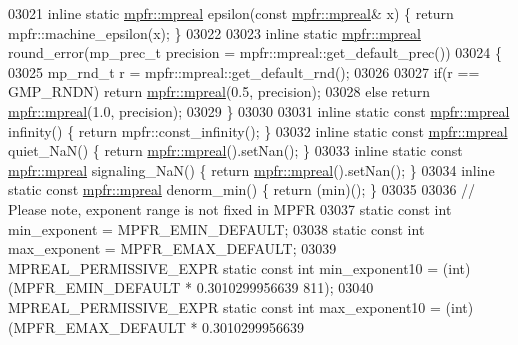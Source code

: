\begin{DoxyCode}
{{{03021         \textcolor{keyword}{inline} \textcolor{keyword}{static} \hyperlink{classmpfr_1_1mpreal}{mpfr::mpreal} epsilon(\textcolor{keyword}{const} \hyperlink{classmpfr_1_1mpreal}{mpfr::mpreal}& x) \{  \textcolor{keywordflow}{return} 
      mpfr::machine\_epsilon(x);  \}
03022 
03023         \textcolor{keyword}{inline} \textcolor{keyword}{static} \hyperlink{classmpfr_1_1mpreal}{mpfr::mpreal} round\_error(mp\_prec\_t precision = 
      mpfr::mpreal::get\_default\_prec())
03024         \{
03025             mp\_rnd\_t r = mpfr::mpreal::get\_default\_rnd();
03026 
03027             \textcolor{keywordflow}{if}(r == GMP\_RNDN)  \textcolor{keywordflow}{return} \hyperlink{classmpfr_1_1mpreal}{mpfr::mpreal}(0.5, precision);
03028             \textcolor{keywordflow}{else}               \textcolor{keywordflow}{return} \hyperlink{classmpfr_1_1mpreal}{mpfr::mpreal}(1.0, precision);
03029         \}
03030 
03031         \textcolor{keyword}{inline} \textcolor{keyword}{static} \textcolor{keyword}{const} \hyperlink{classmpfr_1_1mpreal}{mpfr::mpreal} infinity()         \{ \textcolor{keywordflow}{return} mpfr::const\_infinity();   
        \}
03032         \textcolor{keyword}{inline} \textcolor{keyword}{static} \textcolor{keyword}{const} \hyperlink{classmpfr_1_1mpreal}{mpfr::mpreal} quiet\_NaN()        \{ \textcolor{keywordflow}{return} 
      \hyperlink{classmpfr_1_1mpreal}{mpfr::mpreal}().setNan();    \}
03033         \textcolor{keyword}{inline} \textcolor{keyword}{static} \textcolor{keyword}{const} \hyperlink{classmpfr_1_1mpreal}{mpfr::mpreal} signaling\_NaN()    \{ \textcolor{keywordflow}{return} 
      \hyperlink{classmpfr_1_1mpreal}{mpfr::mpreal}().setNan();    \}
03034         \textcolor{keyword}{inline} \textcolor{keyword}{static} \textcolor{keyword}{const} \hyperlink{classmpfr_1_1mpreal}{mpfr::mpreal} denorm\_min()       \{ \textcolor{keywordflow}{return} (min)();                  
        \}
03035 
03036         \textcolor{comment}{// Please note, exponent range is not fixed in MPFR}
03037         \textcolor{keyword}{static} \textcolor{keyword}{const} \textcolor{keywordtype}{int} min\_exponent = MPFR\_EMIN\_DEFAULT;
03038         \textcolor{keyword}{static} \textcolor{keyword}{const} \textcolor{keywordtype}{int} max\_exponent = MPFR\_EMAX\_DEFAULT;
03039         MPREAL\_PERMISSIVE\_EXPR \textcolor{keyword}{static} \textcolor{keyword}{const} \textcolor{keywordtype}{int} min\_exponent10 = (int) (MPFR\_EMIN\_DEFAULT * 0.3010299956639
      811);
03040         MPREAL\_PERMISSIVE\_EXPR \textcolor{keyword}{static} \textcolor{keyword}{const} \textcolor{keywordtype}{int} max\_exponent10 = (int) (MPFR\_EMAX\_DEFAULT * 0.3010299956639
}}}
\end{DoxyCode}
